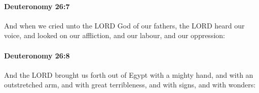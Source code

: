 		\paragraph{Deuteronomy 26:7} %
			\label{DEUTERONOMY-26-7}

			And when we cried unto the LORD God of our fathers, the LORD heard our voice, and looked on our affliction, and our labour, and our oppression:


		\paragraph{Deuteronomy 26:8} %
			\label{DEUTERONOMY-26-8}

			And the LORD brought us forth out of Egypt with a mighty hand, and with an outstretched arm, and with great terribleness, and with signs, and with wonders:


